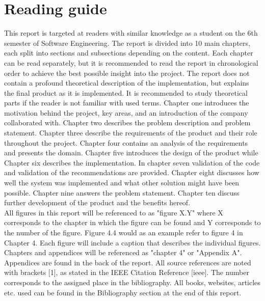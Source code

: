
\chapter{Reading guide} %

\label{readingGuide} %


This report is targeted at readers with similar knowledge as a student on the 6th semester of
Software Engineering. The report
is divided into 10 main chapters, each split into sections and subsections depending on the content.
Each chapter can be read separately, but it is recommended to read the report in chronological order
to achieve the best possible insight into the project. The report does not contain a profound theoretical
description of the implementation, but explains the final product as it is implemented. It is
recommended to study theoretical parts if the reader is not familiar with used terms.
Chapter one introduces the motivation behind the project, key areas, and an introduction of the company collaborated with. Chapter two describes the problem description and problem statement. Chapter three describe the
requirements of the product and their role throughout the project. Chapter four contains an analysis
of the requirements and presents the domain. Chapter five introduces the design of the
product while Chapter six describes the implementation. In chapter seven validation of the code and validation of the recommendations are provided. Chapter eight discusses how well the system was implemented and what other solution might have been possible. Chapter nine answers the problem statement. Chapter ten discuss further development of the product and the benefits hereof.\\
All figures in this report will be referenced to as "figure X.Y" where X corresponds to the chapter in
which the figure can be found and Y corresponds to the number of the figure. Figure 4.4 would as an
example refer to figure 4 in Chapter 4. Each figure will include a caption that describes the individual
figures. Chapters and appendices will be referenced as "chapter 4" or "Appendix A". Appendices are found in the back of the report.
All source references are noted with brackets [1], as stated in the IEEE Citation Reference [ieee]. The number
corresponds to the assigned place in the bibliography. All books, websites, articles etc. used can be
found in the Bibliography section at the end of this report.